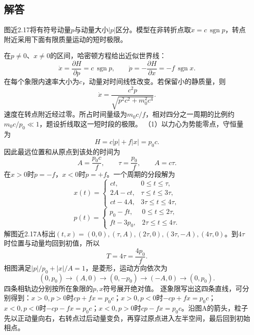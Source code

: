 \documentclass[UTF8,fontset=fandol,a4paper,11pt]{ctexart}
\newcommand{\figcaption}[1]{\par\vspace{2pt}{\small\color{muted}#1}\par}
\begin{document}
\begin{center}\begin{minipage}{.98\linewidth}\centering
{}
\figcaption{图近2.17\quad 两夸克可相互穿过；势能按分离距离增长。}
\end{minipage}\end{center}

\subsection*{解答}


图近2.17将有符号动量$p$与动量大小$|p|$区分。模型在非转折点取$\dot x=c\,\operatorname{sgn}p$，转点附近采用下面有限质量运动的短时极限。

在$p\ne0$、$x\ne0$的区间，哈密顿方程给出近似世界线：
\[
\dot x=\frac{\partial H}{\partial p}=c\,\operatorname{sgn}p,\qquad
\dot p=-\frac{\partial H}{\partial x}=-f\,\operatorname{sgn}x.
\]
在每个象限内速率大小为$c$，动量对时间线性改变。若保留小的静质量，则
\[
\dot x=\frac{c^2p}{\sqrt{p^2c^2+m_0^2c^4}}.
\]
速度在转点附近经过零。所占时间量级为$m_0c/f$，相对四分之一周期的比例约$m_0c/p_0\ll1$，题设折线取这一短时段的极限。
（1）以力心为势能零点，守恒量为
\[
H=c|p|+f|x|=p_0c.
\]
因此最远位置和从原点到该处的时间为
\[
A=\frac{p_0c}{f},\qquad
\tau=\frac{p_0}{f},\qquad A=c\tau.
\]
在$x>0$时$\dot p=-f$，$x<0$时$\dot p=+f$。一个周期的分段解为
\[
x(t)=
\begin{cases}
ct,&0\le t\le\tau,\\
2A-ct,&\tau\le t\le3\tau,\\
ct-4A,&3\tau\le t\le4\tau,
\end{cases}
\]
\[
p(t)=
\begin{cases}
p_0-ft,&0\le t\le2\tau,\\
ft-3p_0,&2\tau\le t\le4\tau.
\end{cases}
\]
解图近2.17A标出$(t,x)=(0,0),(\tau,A),(2\tau,0),(3\tau,-A),(4\tau,0)$。到$4\tau$时位置与动量均回到初值，所以
\[
\boxed{T=4\tau=\frac{4p_0}{f}}.
\]
相图满足$|p|/p_0+|x|/A=1$，是菱形，运动方向依次为
\[
(0,p_0)\longrightarrow(A,0)\longrightarrow(0,-p_0)
\longrightarrow(-A,0)\longrightarrow(0,p_0).
\]
四条相轨边分别按所在象限的$p,x$符号展开绝对值。
逐象限写出这四条直线，可分别得到：$x>0,p>0$时$cp+fx=p_0c$；$x>0,p<0$时$-cp+fx=p_0c$；$x<0,p<0$时$-cp-fx=p_0c$；$x<0,p>0$时$cp-fx=p_0c$。沿图A的箭头，粒子先以正动量向右，右转点过后动量变负，再穿过原点进入左半空间，最后回到初始相点。
\end{document}
